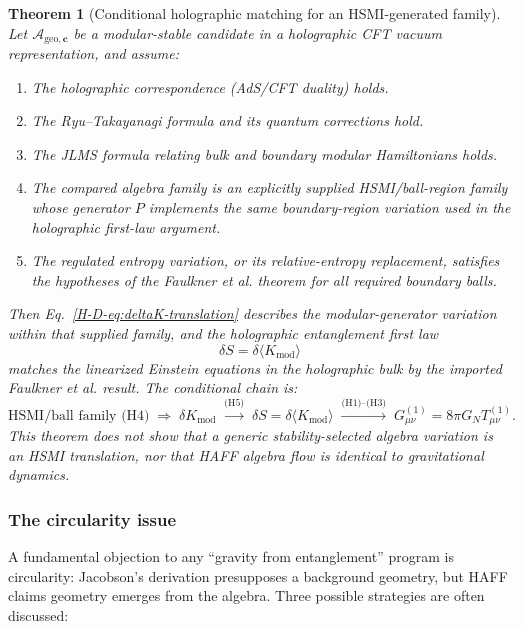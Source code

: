 \documentclass[12pt,a4paper,openany]{book}
\newtheorem{theorem}{Theorem}[chapter]
\begin{document}
\begin{theorem}[Conditional holographic matching for an HSMI-generated family]
\label{H-D-thm:linearized}
Let $\mathcal{A}_{\mathrm{geo},\mathbf{c}}$ be a modular-stable candidate in a holographic CFT vacuum representation, and assume:
\begin{enumerate}
\item[(H1)] The holographic correspondence (AdS/CFT duality) holds.
\item[(H2)] The Ryu--Takayanagi formula and its quantum corrections hold.
\item[(H3)] The JLMS formula relating bulk and boundary modular Hamiltonians holds.
\item[(H4)] The compared algebra family is an explicitly supplied HSMI/ball-region family whose generator $P$ implements the same boundary-region variation used in the holographic first-law argument.
\item[(H5)] The regulated entropy variation, or its relative-entropy replacement, satisfies the hypotheses of the Faulkner et al. theorem for all required boundary balls.
\end{enumerate}
Then Eq.~\eqref{H-D-eq:deltaK-translation} describes the modular-generator variation within that supplied family, and the holographic entanglement first law
\begin{equation}
\delta S = \delta\langle K_{\mathrm{mod}}\rangle
\end{equation}
matches the linearized Einstein equations in the holographic bulk by the imported Faulkner et al. result.  The conditional chain is:
\begin{equation}
\text{HSMI/ball family (H4)}
\;\Longrightarrow\;\delta K_{\mathrm{mod}}
\;\xrightarrow{\text{(H5)}}\;
\delta S=\delta\langle K_{\mathrm{mod}}\rangle
\;\xrightarrow{\text{(H1)--(H3)}}\;
G_{\mu\nu}^{(1)}=8\pi G_NT_{\mu\nu}^{(1)}.
\end{equation}
This theorem does not show that a generic stability-selected algebra variation is an HSMI translation, nor that HAFF algebra flow is identical to gravitational dynamics.
\end{theorem}

\subsubsection{The circularity issue}

A fundamental objection to any ``gravity from entanglement'' program is circularity: Jacobson's derivation \cite{Jacobson1995} presupposes a background geometry, but HAFF claims geometry emerges from the algebra.
Three possible strategies are often discussed:
\end{document}
